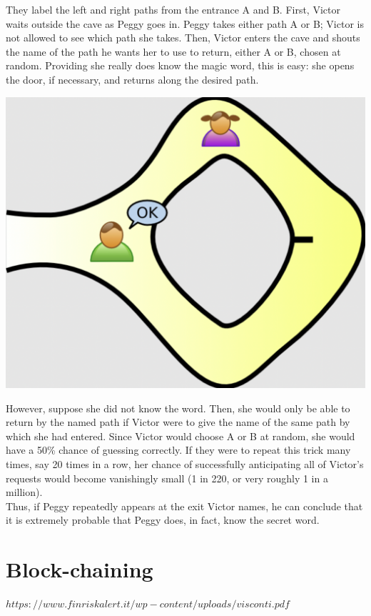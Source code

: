 \documentclass[11pt, oneside]{article}   	%
\begin{document}
They label the left and right paths from the entrance A and B. First, Victor waits outside the cave as Peggy goes in. Peggy takes either path A or B; Victor is not allowed to see which path she takes. Then, Victor enters the cave and shouts the name of the path he wants her to use to return, either A or B, chosen at random. Providing she really does know the magic word, this is easy: she opens the door, if necessary, and returns along the desired path.\\
\begin{center}
\includegraphics[scale= 0.3]{1k}
\end{center}

However, suppose she did not know the word. Then, she would only be able to return by the named path if Victor were to give the name of the same path by which she had entered. Since Victor would choose A or B at random, she would have a 50\% chance of guessing correctly. If they were to repeat this trick many times, say 20 times in a row, her chance of successfully anticipating all of Victor's requests would become vanishingly small (1 in 220, or very roughly 1 in a million).\\
Thus, if Peggy repeatedly appears at the exit Victor names, he can conclude that it is extremely probable that Peggy does, in fact, know the secret word.

\section*{Block-chaining}
\emph{$https://www.finriskalert.it/wp-content/uploads/visconti.pdf$}
\end{document}
